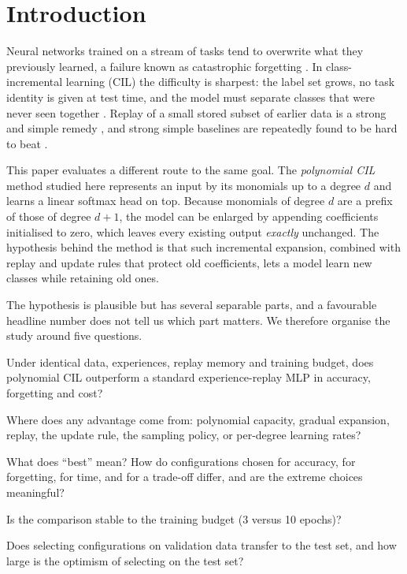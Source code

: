 \documentclass[11pt,a4paper]{article}
\newcommand{\RQ}[1]{\textbf{RQ#1}}
\begin{document}
\section{Introduction}
Neural networks trained on a stream of tasks tend to overwrite what they previously learned, a failure known as catastrophic forgetting \cite{mccloskey1989}. In class-incremental learning (CIL) the difficulty is sharpest: the label set grows, no task identity is given at test time, and the model must separate classes that were never seen together \cite{vandeven2019,hsu2018}. Replay of a small stored subset of earlier data is a strong and simple remedy \cite{chaudhry2019tiny,rebuffi2017}, and strong simple baselines are repeatedly found to be hard to beat \cite{hsu2018,prabhu2020}.

This paper evaluates a different route to the same goal. The \emph{polynomial CIL} method studied here represents an input by its monomials up to a degree $d$ and learns a linear softmax head on top. Because monomials of degree $d$ are a prefix of those of degree $d{+}1$, the model can be enlarged by appending coefficients initialised to zero, which leaves every existing output \emph{exactly} unchanged. The hypothesis behind the method is that such incremental expansion, combined with replay and update rules that protect old coefficients, lets a model learn new classes while retaining old ones.

The hypothesis is plausible but has several separable parts, and a favourable headline number does not tell us which part matters. We therefore organise the study around five questions.
\begin{description}[leftmargin=1.6cm,style=nextline]
\item[\RQ{1}] Under identical data, experiences, replay memory and training budget, does polynomial CIL outperform a standard experience-replay MLP in accuracy, forgetting and cost?
\item[\RQ{2}] Where does any advantage come from: polynomial capacity, gradual expansion, replay, the update rule, the sampling policy, or per-degree learning rates?
\item[\RQ{3}] What does ``best'' mean? How do configurations chosen for accuracy, for forgetting, for time, and for a trade-off differ, and are the extreme choices meaningful?
\item[\RQ{4}] Is the comparison stable to the training budget (3 versus 10 epochs)?
\item[\RQ{5}] Does selecting configurations on validation data transfer to the test set, and how large is the optimism of selecting on the test set?
\end{description}
\end{document}
